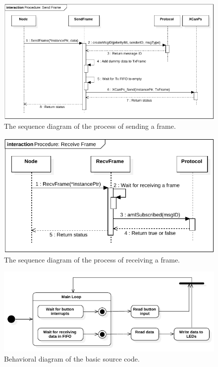 \begin{figure}[h!]
	\centering
	\includegraphics[width = 1.1\linewidth]{graphics/SeqDiagram_SendFrame.pdf}
	\caption{The sequence diagram of the process of sending a frame.}
	\label{fig:SeqDiagram_SendFrame}
\end{figure}

\begin{figure}[h!]
	\centering
	\includegraphics[width = 1.1\linewidth]{graphics/SeqDiagram_RecvFrame.pdf}
	\caption{The sequence diagram of the process of receiving a frame.}
	\label{fig:SeqDiagram_RecvFrame}
\end{figure}



\begin{figure}[h!]
	\centering
	\includegraphics[width = 1.1\linewidth]{graphics/StateDiagram_CanStackTestCode.pdf}
	\caption{Behavioral diagram of the basic source code.}
	\label{fig:CAN_Testing_StateDiagr_Code}
\end{figure}